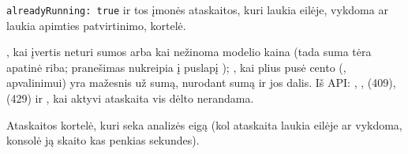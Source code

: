 \begin{description}[style=multiline, leftmargin=19mm, labelwidth=17mm, labelsep=2mm,
  font=\sffamily\bfseries\footnotesize\color{ink}, itemsep=1pt, topsep=2pt, before=\raggedright]
    \texttt{alreadyRunning: true} ir tos įmonės ataskaitos, kuri laukia eilėje, vykdoma ar
    laukia apimties patvirtinimo, kortelė.
  \item[Klaidos] , kai įvertis neturi sumos arba kai nežinoma modelio kaina
    (tada suma tėra apatinė riba; pranešimas nukreipia į puslapį );
    , kai  plius pusė cento
    (, apvalinimui) yra mažesnis už sumą, nurodant sumą ir jos dalis. Iš
    API: , ,  (409),
     (429) ir , kai aktyvi ataskaita vis dėlto
    nerandama.
  \item[Konsolė] Ataskaitos kortelė, kuri seka analizės eigą (kol ataskaita laukia eilėje ar
    vykdoma, konsolė ją skaito kas penkias sekundes).
\end{description}

